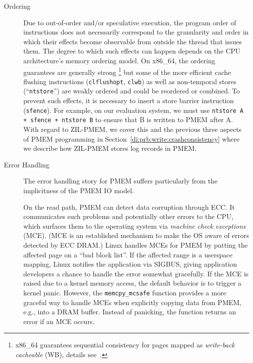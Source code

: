 \documentclass[12pt,a4paper,twoside]{book}
\begin{document}
\begin{description}
    \item[Ordering]
        Due to out-of-order and/or speculative execution, the program order of instructions does not necessarily correspond to the granularity and order in which their effects become observable from outside the thread that issues them.
        The degree to which such effects can happen depends on the CPU architecture's memory ordering model.
        On x86\_64, the ordering guarantees are generally strong%
        \footnote{x86\_64 guarantees sequential consistency for pages mapped as \textit{write-back cacheable} (WB), details see~\cite{braisSignificanceX86SFENCE2019}.}
        but some of the more efficient cache flushing instructions (\lstinline{clflushopt}, \lstinline{clwb}) as well as non-temporal stores (``\lstinline{ntstore}'') are weakly ordered and could be reordered or combined.
        To prevent such effects, it is necessary to insert a store barrier instruction (\lstinline{sfence}).
        For example, on our evaluation system, we must use \lstinline{ntstore A + sfence + ntstore B} to ensure that B is written to PMEM after A.
        With regard to ZIL-PMEM, we cover this and the previous three aspects of PMEM programming in Section~\ref{di:prb:write:crashconsistency} where we describe how ZIL-PMEM stores log records in PMEM.~\cite{rudoffPersistentMemoryProgramming2017,braisSignificanceX86SFENCE2019}

    \item[Error Handling] The error handling story for PMEM suffers particularly from the implicitness of the PMEM IO model.

        On the read path, PMEM can detect data corruption through ECC.
        It communicates such problems and potentially other errors to the CPU, which surfaces them to the operating system via \textit{machine check exceptions} (MCE).
        (MCE is an established mechanism to make the OS aware of errors detected by ECC DRAM.)
        Linux handles MCEs for PMEM by putting the affected page on a ``bad block list''.
        If the affected range is a userspace mapping, Linux notifies the application via SIGBUS, giving application developers a chance to handle the error somewhat gracefully.
        If the MCE is raised due to a kernel memory access, the default behavior is to trigger a kernel panic.
        However, the \lstinline{memcpy_mcsafe} function provides a more graceful way to handle MCEs when explicitly copying data from PMEM, e.g., into a DRAM buffer.
        Instead of panicking, the function returns an error if an MCE occurs.~\cite{ReliabilityAvailabilityServiceability,PersistentmemoryErrorHandling,Scargall2020,xuNOVAFortisFaulttolerantNonvolatile2017}


\end{description}
\end{document}
